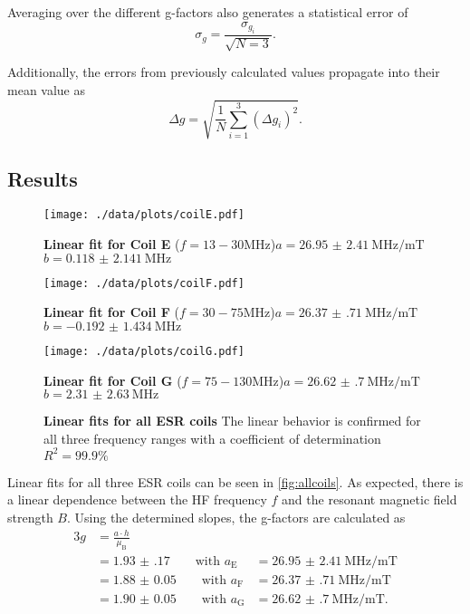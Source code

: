 Averaging over the different g-factors also generates a statistical error of
\begin{equation*}
	\sigma_g = \frac{\sigma_{g_i}}{\sqrt{N=3}}.
\end{equation*}

Additionally, the errors from previously calculated values propagate into their mean value as
\begin{equation*}
	\Delta g = \sqrt{\frac{1}{N}\sum_{i=1}^3 \left(\Delta g_i\right)^2}.
\end{equation*}

\subsection{Results}
\begin{figure}[tbp]
		\texttt{[image: ./data/plots/coilE.pdf]}
		\caption*{\textbf{Linear fit for Coil E} ($f=13-30\si{\MHz}$)\newline $a=\SI{26.95(241)}{\MHz\per\milli\tesla}$\newline $b=\SI{0.118(2141)}{\MHz}$}\label{fig:coilE}
	\endminipage\hfill
		\texttt{[image: ./data/plots/coilF.pdf]}
		\caption*{\textbf{Linear fit for Coil F} ($f=30-75\si{\MHz}$)\newline $a=\SI{26.37(71)}{\MHz\per\milli\tesla}$\newline $b=\SI{-0.192(1434)}{\MHz}$}\label{fig:coilF}
	\endminipage\hfill\centering
		\texttt{[image: ./data/plots/coilG.pdf]}
		\caption*{\textbf{Linear fit for Coil G} ($f=75-130\si{\MHz}$)\newline $a=\SI{26.62(70)}{\MHz\per\milli\tesla}$\newline $b=\SI{2.31(263)}{\MHz}$}\label{fig:coilG}
	\endminipage
	\caption[Linear fits for all ESR coils]{\textbf{Linear fits for all ESR coils} The linear behavior is confirmed for all three frequency ranges with a coefficient of determination $R^2=\num{99.9}\%$}
	\label{fig:allcoils}
\end{figure}

Linear fits for all three ESR coils can be seen in \autoref{fig:allcoils}.
As expected, there is a linear dependence between the HF frequency $f$ and the resonant magnetic field strength $B$.
Using the determined slopes, the g-factors are calculated as
\begin{alignat*}{3}
	g &= \frac{a\cdot h}{\mu_\text{B}} \\
	&= \num{1.93(17)}\qquad\text{with } a_\text{E}&=\SI{26.95(241)}{\MHz\per\milli\tesla} \\
	&= \num{1.88(5)}\qquad\text{with } a_\text{F}&=\SI{26.37(71)}{\MHz\per\milli\tesla} \\
	&= \num{1.90(5)}\qquad\text{with } a_\text{G}&=\SI{26.62(70)}{\MHz\per\milli\tesla}.
\end{alignat*}

